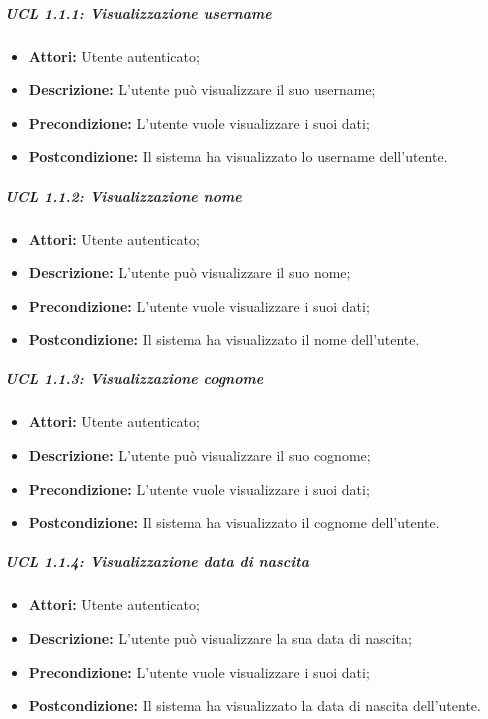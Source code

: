 \subparagraph{UCL 1.1.1: Visualizzazione username}
\begin{itemize}
	\item \textbf{Attori:} Utente autenticato;
	\item \textbf{Descrizione:} L'utente può visualizzare il suo username;
	\item \textbf{Precondizione:} L'utente vuole visualizzare i suoi dati;
\item \textbf{Postcondizione:} Il sistema ha visualizzato lo username dell'utente.
\end{itemize}

\subparagraph{UCL 1.1.2: Visualizzazione nome}
\begin{itemize}
	\item \textbf{Attori:} Utente autenticato;
	\item \textbf{Descrizione:} L'utente può visualizzare il suo nome;
	\item \textbf{Precondizione:} L'utente vuole visualizzare i suoi dati;
	\item \textbf{Postcondizione:} Il sistema ha visualizzato il nome dell'utente.
\end{itemize}

\subparagraph{UCL 1.1.3: Visualizzazione cognome}
\begin{itemize}
	\item \textbf{Attori:} Utente autenticato;
	\item \textbf{Descrizione:} L'utente può visualizzare il suo cognome;
	\item \textbf{Precondizione:} L'utente vuole visualizzare i suoi dati;
	\item \textbf{Postcondizione:} Il sistema ha visualizzato il cognome dell'utente.
\end{itemize}

\subparagraph{UCL 1.1.4: Visualizzazione data di nascita}
\begin{itemize}
	\item \textbf{Attori:} Utente autenticato;
	\item \textbf{Descrizione:} L'utente può visualizzare la sua data di nascita;
	\item \textbf{Precondizione:} L'utente vuole visualizzare i suoi dati;
	\item \textbf{Postcondizione:} Il sistema ha visualizzato la data di nascita dell'utente.
\end{itemize}

